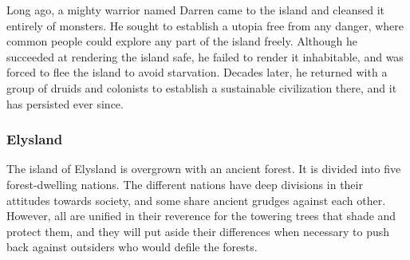             Long ago, a mighty warrior named Darren came to the island and cleansed it entirely of monsters.
            He sought to establish a utopia free from any danger, where common people could explore any part of the island freely.
            Although he succeeded at rendering the island safe, he failed to render it inhabitable, and was forced to flee the island to avoid starvation.
            Decades later, he returned with a group of druids and colonists to establish a sustainable civilization there, and it has persisted ever since.
            
        \subsubsection{Elysland}
            The island of Elysland is overgrown with an ancient forest.
            It is divided into five forest-dwelling nations.
            The different nations have deep divisions in their attitudes towards society, and some share ancient grudges against each other.
            However, all are unified in their reverence for the towering trees that shade and protect them, and they will put aside their differences when necessary to push back against outsiders who would defile the forests.
